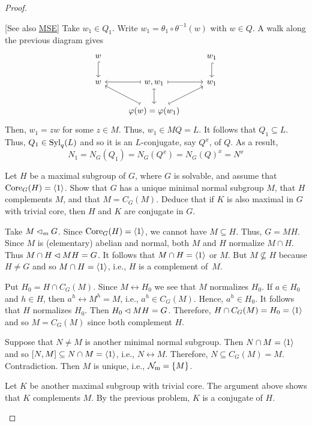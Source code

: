 \begin{proof}
\begin{solution} {[See also \href{https://math.stackexchange.com/a/617987/269050}{MSE}]}
Take $w_1\in Q_1$. Write $w_1=\theta_1\circ\theta^{-1}(w)$ with $w\in Q$. A walk along the previous diagram gives
$$
    \begin{tikzcd}
        w \arrow[d, hook]
            &
            & w_1 \arrow[d, hook] \\
        w
            & {w,w_1} \arrow[d, maps to] \arrow[r, maps to] \arrow[l, maps to]
            & w_1\\
            & \varphi(w)=\varphi(w_1) \arrow[ru, maps to] \arrow[lu, maps to]
            &                    
    \end{tikzcd}
$$
Then, $w_1=zw$ for some $z\in M$. Thus, $w_1\in MQ=L$. It follows that $Q_1\subseteq L$. Thus, $Q_1\in{\rm Syl}_q(L)$ and so it is an $L$-conjugate, say $Q^x$, of $Q$. As a result,
$$
    N_1 = N_G(Q_1) = N_G(Q^x) = N_G(Q)^x = N^x
$$
 \end{solution}

\begin{probl}
    Let\/ $H$ be a maximal subgroup of\/ $G$, where\/ $G$ is solvable, and assume that\/ ${\rm Core}_G(H) = \langle1\rangle$. Show that\/ $G$ has a unique minimal normal subgroup\/ $M$, that\/ $H$ complements\/ $M$, and that\/ $M = C_G(M)$. Deduce that if\/ $K$ is also maximal in\/ $G$ with trivial core, then\/ $H$ and\/ $K$ are conjugate in\/ $G$.
\end{probl}

\begin{solution} Take $M\lhd_mG$. Since ${\rm Core}_G(H)=\langle1\rangle$, we cannot have $M\subseteq H$. Thus, $G=MH$. Since $M$ is (elementary) abelian and normal, both $M$ and $H$ normalize $M\cap H$. Thus $M\cap H\lhd MH=G$. It follows that $M\cap H=\langle1\rangle$ or $M$. But $M\not\subseteq H$ because $H\ne G$ and so $M\cap H=\langle1\rangle$, i.e., $H$ is a complement of~$M$.

Put $H_0=H\cap C_G(M)$. Since $M\leftrightarrow H_0$ we see that $M$ normalizes $H_0$. If $a\in H_0$ and $h\in H$, then $a^h\leftrightarrow M^h=M$, i.e., $a^h\in C_G(M)$. Hence, $a^h\in H_0$. It follows that $H$ normalizes $H_0$. Then $H_0\lhd MH=G$. Therefore, $H\cap C_G(M)=H_0=\langle1\rangle$ and so $M=C_G(M)$ since both complement $H$.


Suppose that $N\ne M$ is another minimal normal subgroup. Then $N\cap M=\langle1\rangle$ and so $[N,M]\subseteq N\cap M=\langle1\rangle$, i.e., $N\leftrightarrow M$. Therefore, $N\subseteq C_G(M)=M$. Contradiction. Then $M$ is unique, i.e., $\operatorname{{\cal N}_m}=\{M\}$.

Let $K$ be another maximal subgroup with trivial core. The argument above shows that $K$ complements $M$. By the previous problem, $K$ is a conjugate of $H$.  \end{solution}


\end{proof}

